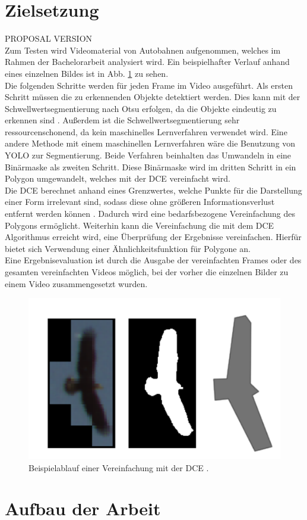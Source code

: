 \section{Zielsetzung}{ PROPOSAL VERSION  \\
Zum Testen wird Videomaterial von Autobahnen aufgenommen, welches im Rahmen der Bachelorarbeit analysiert wird. Ein beispielhafter Verlauf anhand eines einzelnen Bildes ist in Abb. \ref{Bsp_Dorr} zu sehen. \\
Die folgenden Schritte werden für jeden Frame im Video ausgeführt. 
Als ersten Schritt müssen die zu erkennenden Objekte detektiert werden. Dies kann mit der Schwellwertsegmentierung nach Otsu erfolgen, da die Objekte eindeutig zu erkennen sind \citep{Otsu1979}. Außerdem ist die Schwellwertsegmentierung sehr ressourcenschonend, da kein maschinelles Lernverfahren verwendet wird. Eine andere Methode mit einem maschinellen Lernverfahren wäre die Benutzung von YOLO zur Segmentierung. Beide Verfahren beinhalten das Umwandeln in eine Binärmaske als zweiten Schritt. Diese Binärmaske wird im dritten Schritt in ein Polygon umgewandelt, welches mit der DCE vereinfacht wird. \\
Die DCE berechnet anhand eines Grenzwertes, welche Punkte für die Darstellung einer Form irrelevant sind, sodass diese ohne größeren Informationsverlust entfernt werden können \citep{Barkowsky2000}. Dadurch wird eine bedarfsbezogene Vereinfachung des Polygons ermöglicht. 
Weiterhin kann die Vereinfachung die mit dem DCE Algorithmus erreicht wird, eine Überprüfung der Ergebnisse vereinfachen. Hierfür bietet sich Verwendung einer Ähnlichkeitsfunktion für Polygone an. \\
Eine Ergebnisevaluation ist durch die Ausgabe der vereinfachten Frames  oder des gesamten vereinfachten Videos möglich, bei der vorher die einzelnen Bilder zu einem Video zusammengesetzt wurden. \\}
\begin{figure}[ht]
	\vspace{-0.5cm}
	   \centering
	   \includegraphics*[scale = 0.5, keepaspectratio, trim=2 2 2 2 ]{images/Example_bird.png}
	   \caption[Beispielablauf der Segmentierung und DCE]{Beispielablauf einer Vereinfachung mit der DCE \citep{Dorr2017}.}
	   \label{Bsp_Dorr}
\end{figure}
\section{Aufbau der Arbeit}
{}




